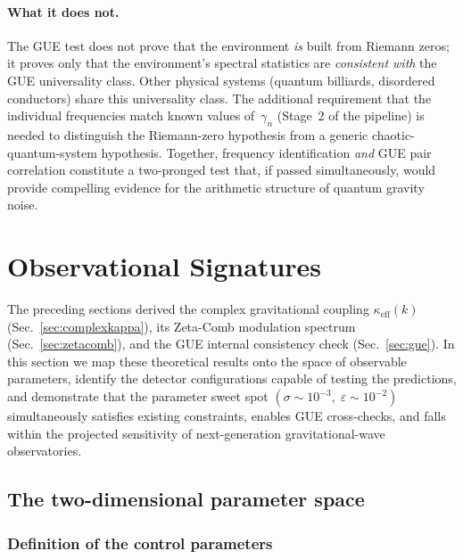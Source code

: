 \documentclass[12pt,a4paper]{article}
\begin{document}
\paragraph{What it does not.}
The GUE test does not prove that the environment
\emph{is} built from Riemann zeros;
it proves only that the environment's spectral statistics
are \emph{consistent with} the GUE universality class.
Other physical systems (quantum billiards, disordered
conductors) share this universality class.
The additional requirement that the individual
frequencies match known values of~$\gamma_n$
(Stage~2 of the pipeline) is needed to distinguish
the Riemann-zero hypothesis from a generic
chaotic-quantum-system hypothesis.
Together, frequency identification \emph{and}
GUE pair correlation constitute a two-pronged test
that, if passed simultaneously, would provide
compelling evidence for the arithmetic structure of
quantum gravity noise.



\section{Observational Signatures}\label{sec:observational}

The preceding sections derived the complex gravitational coupling
$\kappa_{\mathrm{eff}}(k)$ (Sec.~\ref{sec:complexkappa}),
its Zeta-Comb modulation spectrum (Sec.~\ref{sec:zetacomb}),
and the GUE internal consistency check (Sec.~\ref{sec:gue}).
In this section we map these theoretical results onto the
space of observable parameters, identify the detector
configurations capable of testing the predictions,
and demonstrate that the parameter sweet spot
$(\sigma\sim 10^{-3},\;\varepsilon\sim 10^{-2})$
simultaneously satisfies existing constraints,
enables GUE cross-checks, and falls within the
projected sensitivity of next-generation
gravitational-wave observatories.


\subsection{The two-dimensional parameter space}
\label{sec:paramspace}

\subsubsection{Definition of the control parameters}
\end{document}
